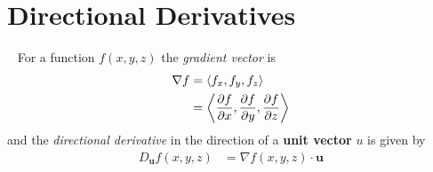 \documentclass[12pt]{exam}
\newcommand{\qdate}{Directional Derivatives} %
\begin{document}
\section*{\qdate}



\begin{info}
    ~
    For a function \(f(x,y,z)\) the \emph{gradient vector} is 
    \begin{align*}
        \nabla f&= \left\langle f_{x},f_{y},f_{z} \right\rangle\\
            &= \left\langle \dfrac{\partial f}{\partial x},\dfrac{\partial f}{\partial y},\dfrac{\partial f}{\partial z} \right\rangle
    \end{align*}
    and the \emph{directional derivative} in the direction of a \textbf{unit vector} \(u\) is given by
    \begin{align*}
        D_{\bm{u}}f(x,y,z) & = \nabla f(x,y,z)\cdot \bm{u}
    \end{align*}
\end{info}
\end{document}
